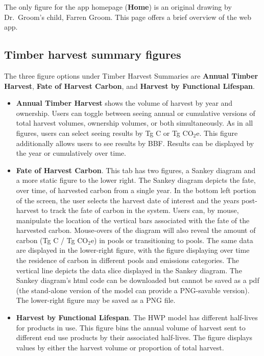 \documentclass[
  openany]{book}
\begin{document}
The only figure for the app homepage (\textbf{Home}) is an original
drawing by Dr.~Groom's child, Farren Groom. This page offers a brief
overview of the web app.

\hypertarget{app-shiny-timber}{%
\subsection{Timber harvest summary figures}\label{app-shiny-timber}}

The three figure options under Timber Harvest Summaries are
\textbf{Annual Timber Harvest}, \textbf{Fate of Harvest Carbon}, and
\textbf{Harvest by Functional Lifespan}.

\begin{itemize}
\item
  \textbf{Annual Timber Harvest} shows the volume of harvest by year and
  ownership. Users can toggle between seeing annual or cumulative
  versions of total harvest volumes, ownership volumes, or both
  simultaneously. As in all figures, users can select seeing results by
  Tg C or Tg CO\(_2\)e. This figure additionally allows users to see
  results by BBF. Results can be displayed by the year or cumulatively
  over time.
\item
  \textbf{Fate of Harvest Carbon}. This tab has two figures, a Sankey
  diagram and a more static figure to the lower right. The Sankey
  diagram depicts the fate, over time, of harvested carbon from a single
  year. In the bottom left portion of the screen, the user selects the
  harvest date of interest and the years post-harvest to track the fate
  of carbon in the system. Users can, by mouse, manipulate the location
  of the vertical bars associated with the fate of the harvested carbon.
  Mouse-overs of the diagram will also reveal the amount of carbon (Tg C
  / Tg CO\(_2\)e) in pools or transitioning to pools. The same data are
  displayed in the lower-right figure, with the figure displaying over
  time the residence of carbon in different pools and emissions
  categories. The vertical line depicts the data slice displayed in the
  Sankey diagram. The Sankey diagram's html code can be downloaded but
  cannot be saved as a pdf (the stand-alone version of the model can
  provide a PNG-savable version). The lower-right figure may be saved as
  a PNG file.
\item
  \textbf{Harvest by Functional Lifespan}. The HWP model has different
  half-lives for products in use. This figure bins the annual volume of
  harvest sent to different end use products by their associated
  half-lives. The figure displays values by either the harvest volume or
  proportion of total harvest.
\end{itemize}
\end{document}
